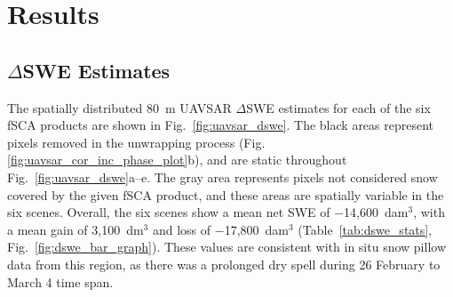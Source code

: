 \hypertarget{ch4-results}{\section{Results}\label{ch4-results}}
\hypertarget{ch4-results}{\subsection{$\Delta$SWE Estimates}\label{ch4-results}}

The spatially distributed 80~m UAVSAR $\Delta$SWE estimates for each of the six fSCA products are shown in Fig.~\ref{fig:uavsar_dswe}. The black areas represent pixels removed in the unwrapping process (Fig. \ref{fig:uavsar_cor_inc_phase_plot}b), and are static throughout Fig.~\ref{fig:uavsar_dswe}a--e. The gray area represents pixels not considered snow covered by the given fSCA product, and these areas are spatially variable in the six scenes. Overall, the six scenes show a mean net SWE of $-$14,600~dam$^{3}$, with a mean gain of 3,100~dm$^{3}$ and loss of $-$17,800~dam$^{3}$ (Table~\ref{tab:dswe_stats}, Fig.~\ref{fig:dswe_bar_graph}). These values are consistent with in situ snow pillow data from this region, as there was a prolonged dry spell during 26 February to March 4 time span.

